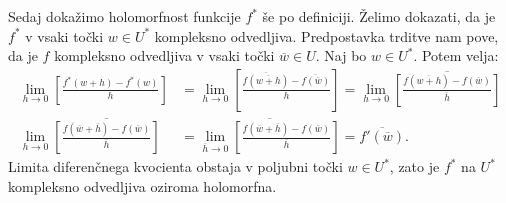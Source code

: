 \documentclass[mat1]{fmfdelo}
\begin{document}
\begin{dokaz}
        Sedaj dokažimo holomorfnost funkcije $f^*$ še po definiciji. Želimo dokazati, da je $f^*$ v vsaki točki $w \in U^*$ kompleksno odvedljiva. Predpostavka trditve nam pove, da je $f$ kompleksno odvedljiva v vsaki točki $\overline{w} \in U$.
        Naj bo $w \in U^*$. Potem velja: 
        \begin{align*}
            \lim_{h \to 0}\left[{\frac{f^*(w + h) - f^*(w)}{h}}\right] &= \lim_{h \to 0}\left[{\frac{\overline{f\left(\overline{w + h}\right)} - \overline{f(\overline{w})}}{h}}\right] = \lim_{h \to 0}{\overline{\left[\frac{f\left(\overline{w + h}\right) - f(\overline{w})}{\overline{h}}\right]}} \\
            \lim_{h \to 0}{\overline{\left[\frac{f\left(\overline{w} + \overline{h}\right) - f(\overline{w})}{\overline{h}}\right]}} & = \overline{\lim_{\overline{h} \to 0}{\left[\frac{f\left(\overline{w} + \overline{h}\right) - f(\overline{w})}{\overline{h}}\right]}} = \overline{f'(\overline{w})}.
        \end{align*}
        Limita diferenčnega kvocienta obstaja v poljubni točki $w \in U^*$, zato je $f^*$ na $U^*$ kompleksno odvedljiva oziroma holomorfna.
    \end{dokaz}
\end{document}
